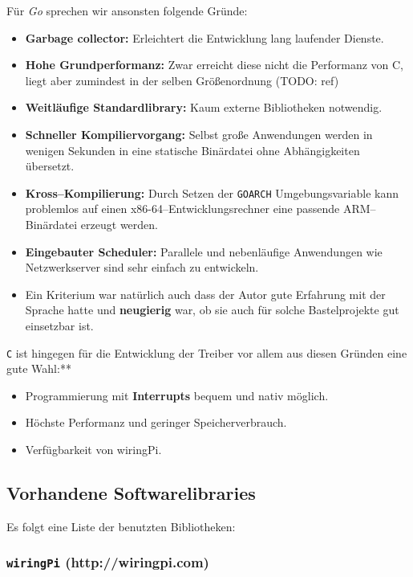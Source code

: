 \documentclass[11pt,ngerman,toc=listof,index=totoc]{scrreprt}
\providecommand{\tightlist}{%
  \setlength{\itemsep}{0pt}\setlength{\parskip}{0pt}}
\begin{document}
Für \emph{Go} sprechen wir ansonsten folgende Gründe:

\begin{itemize}
\tightlist
\item
  \textbf{Garbage collector:} Erleichtert die Entwicklung lang laufender
  Dienste.
\item
  \textbf{Hohe Grundperformanz:} Zwar erreicht diese nicht die
  Performanz von C, liegt aber zumindest in der selben Größenordnung
  (TODO: ref)
\item
  \textbf{Weitläufige Standardlibrary:} Kaum externe Bibliotheken
  notwendig.
\item
  \textbf{Schneller Kompiliervorgang:} Selbst große Anwendungen werden
  in wenigen Sekunden in eine statische Binärdatei ohne Abhängigkeiten
  übersetzt.
\item
  \textbf{Kross--Kompilierung:} Durch Setzen der \texttt{GOARCH}
  Umgebungsvariable kann problemlos auf einen
  x86-64--Entwicklungsrechner eine passende ARM--Binärdatei erzeugt
  werden.
\item
  \textbf{Eingebauter Scheduler:} Parallele und nebenläufige Anwendungen
  wie Netzwerkserver sind sehr einfach zu entwickeln.
\item
  Ein Kriterium war natürlich auch dass der Autor gute Erfahrung mit der
  Sprache hatte und \textbf{neugierig} war, ob sie auch für solche
  Bastelprojekte gut einsetzbar ist.
\end{itemize}

\texttt{C} ist hingegen für die Entwicklung der Treiber vor allem aus
diesen Gründen eine gute Wahl:**

\begin{itemize}
\tightlist
\item
  Programmierung mit \textbf{Interrupts} bequem und nativ möglich.
\item
  Höchste Performanz und geringer Speicherverbrauch.
\item
  Verfügbarkeit von wiringPi.
\end{itemize}

\subsection{Vorhandene
Softwarelibraries}\label{vorhandene-softwarelibraries}

Es folgt eine Liste der benutzten Bibliotheken:

\subsubsection{\texorpdfstring{\texttt{wiringPi}
(http://wiringpi.com)}{wiringPi (http://wiringpi.com)}}\label{wiringpi-httpwiringpi.com}
\end{document}

